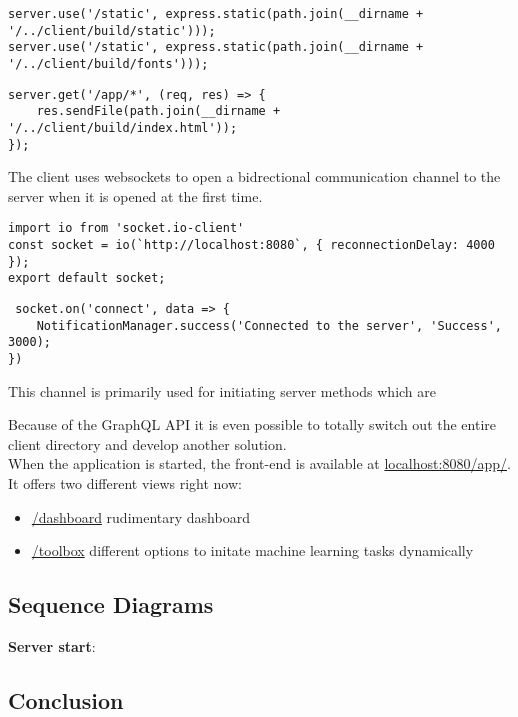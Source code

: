 \documentclass[]{article}
\providecommand{\tightlist}{%
  \setlength{\itemsep}{0pt}\setlength{\parskip}{0pt}}
\begin{document}
\begin{verbatim}
server.use('/static', express.static(path.join(__dirname + '/../client/build/static')));
server.use('/static', express.static(path.join(__dirname + '/../client/build/fonts')));
\end{verbatim}

\begin{verbatim}
server.get('/app/*', (req, res) => {
    res.sendFile(path.join(__dirname + '/../client/build/index.html'));
});
\end{verbatim}

The client uses websockets to open a bidrectional communication channel
to the server when it is opened at the first time.

\begin{verbatim}
import io from 'socket.io-client'
const socket = io(`http://localhost:8080`, { reconnectionDelay: 4000 });
export default socket;
\end{verbatim}

\begin{verbatim}
 socket.on('connect', data => {
    NotificationManager.success('Connected to the server', 'Success', 3000);
})
\end{verbatim}

This channel is primarily used for initiating server methods which are

Because of the GraphQL API it is even possible to totally switch out the
entire client directory and develop another solution.\\
When the application is started, the front-end is available at
\url{localhost:8080/app/}. It offers two different views right now:

\begin{itemize}
\tightlist
\item
  \href{localhost:8080/app/dashbaord}{/dashboard} rudimentary dashboard
\item
  \href{localhost:8080/app/toolbox}{/toolbox} different options to
  initate machine learning tasks dynamically
\end{itemize}

\subsection{Sequence Diagrams}\label{sequence-diagrams}

\textbf{Server start}:


\subsection{Conclusion}\label{conclusion}
\end{document}
